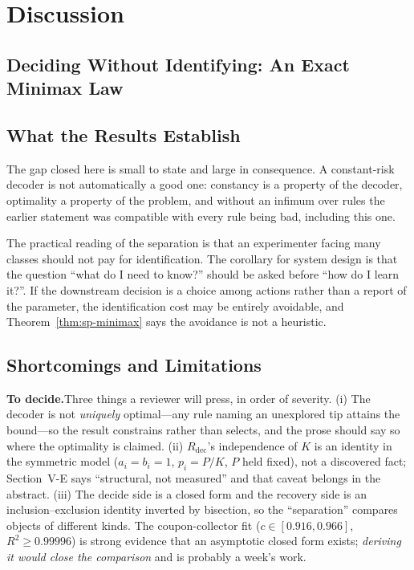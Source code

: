 \documentclass[conference]{IEEEtran}
\theoremstyle{definition}
\newif\ifshownotes\shownotestrue
\newcommand{\TODOPAR}[1]{\ifshownotes\par\vspace{2pt}\noindent%
  {\color{todocol}\textsf{\footnotesize\textbf{To decide.}\;#1}}\par\vspace{2pt}\fi}
\begin{document}
\section{Discussion}

\subsection{Deciding Without Identifying: An Exact Minimax Law}
\label{sec:sp-discussion}

\subsection{What the Results Establish}

The gap closed here is small to state and large in consequence. A constant-risk decoder is not
automatically a good one: constancy is a property of the decoder, optimality a property of the
problem, and without an infimum over rules the earlier statement was compatible with every
rule being bad, including this one.

The practical reading of the separation is that an experimenter facing many classes should not
pay for identification. The corollary for system design is that the question ``what do I need
to know?'' should be asked before ``how do I learn it?''. If the downstream decision is a
choice among actions rather than a report of the parameter, the identification cost may be
entirely avoidable, and Theorem~\ref{thm:sp-minimax} says the avoidance is not a heuristic.

\subsection{Shortcomings and Limitations}
\TODOPAR{Three things a reviewer will press, in order of severity. (i) The decoder is
not \emph{uniquely} optimal---any rule naming an unexplored tip attains the bound---so the
result constrains rather than selects, and the prose should say so where the optimality is
claimed. (ii) $R_{\mathrm{dec}}$'s independence of $K$ is an identity in the symmetric model
($a_{i}=b_{i}=1$, $p_{i}=P/K$, $P$ held fixed), not a discovered fact; Section~V-E says
``structural, not measured'' and that caveat belongs in the abstract. (iii) The decide side is
a closed form and the recovery side is an inclusion--exclusion identity inverted by bisection,
so the ``separation'' compares objects of different kinds. The coupon-collector fit
($c\in[0.916,0.966]$, $R^{2}\ge0.99996$) is strong evidence that an asymptotic closed form
exists; \emph{deriving it would close the comparison} and is probably a week's work.}
\end{document}
